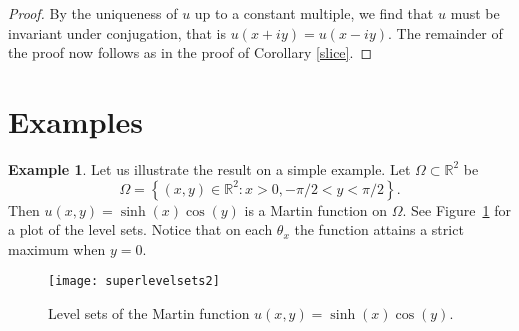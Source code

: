 \documentclass[11pt]{amsart}
\renewcommand{\Re}{\operatorname{Re}}
\newcommand{\R}{{\mathbb{R}}}
\theoremstyle{definition}
\newtheorem{example}[thm]{Example}
\theoremstyle{remark}
\begin{document}
\begin{proof}
By the uniqueness of $u$ up to
a constant multiple, we find that $u$ must be invariant under conjugation,
that is $u(x+iy)=u(x-iy)$. The remainder of the proof now follows as in the proof of Corollary \ref{slice}. 
%
\end{proof}



\vspace{0.1in}

\section{Examples} 

\begin{example}
Let us illustrate the result on a simple example.  Let $\Omega \subset \R^2$ be
$$
\Omega =
\left\{(x,y)\in\mathbb{R}^2: x > 0, -\pi/2 < y < \pi/2 \right\} .
$$
Then $u(x,y) = \sinh(x) \cos(y)$ is a Martin function on $\Omega$.
See Figure~\ref{fig:levelsetssimple} for a plot of the level sets.  Notice
that on each $\theta_x$ the function attains a strict maximum when $y=0$.
\begin{figure}[h!t]
\begin{center}
\texttt{[image: superlevelsets2]}
\end{center}
\caption{Level sets of the Martin function
$u(x,y) = \sinh(x) \cos(y)$.\label{fig:levelsetssimple}}
\end{figure}
\end{example}
\end{document}

